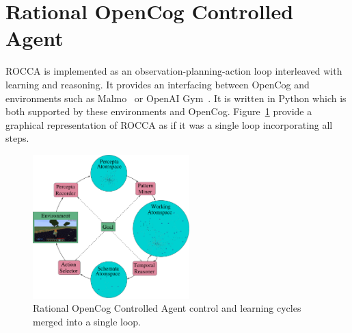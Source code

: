 \documentclass[runningheads]{llncs}
\begin{document}
\section{Rational OpenCog Controlled Agent}
\label{sec:rocca}
ROCCA is implemented as an observation-planning-action loop
interleaved with learning and reasoning.  It provides an interfacing
between OpenCog and environments such as Malmo~\cite{Johnson2016} or
OpenAI Gym~\cite{Brockman2016}.  It is written in Python which is both
supported by these environments and OpenCog.  Figure~\ref{fig:rocca}
provide a graphical representation of ROCCA as if it was a single loop
incorporating all steps.
\begin{figure}
  \vspace{10pt}
  \begin{center}
    \includegraphics[width=0.54\textwidth]{pictures/rocca-chart-v0.7.pdf}
  \end{center}
  \vspace{-20pt}
  \caption{Rational OpenCog Controlled Agent control and learning
    cycles merged into a single loop.}
  \vspace{-32pt}
  \label{fig:rocca}
\end{figure}
\end{document}
